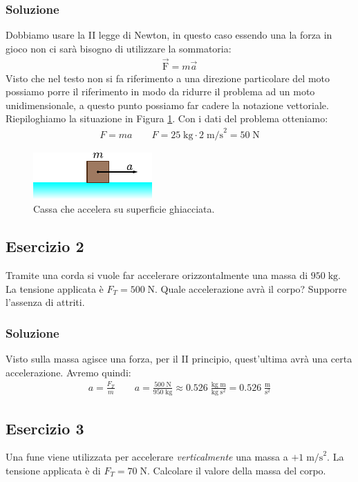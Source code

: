 \documentclass[12pt,a4paper]{book}
\begin{document}
\subsubsection*{Soluzione}
Dobbiamo usare la II legge di Newton, in questo caso essendo una la forza in gioco non ci sarà bisogno di utilizzare la sommatoria:
%
\begin{gather*}
\vec{\text{F}}=m\vec{a}
\end{gather*}
%
Visto che nel testo non si fa riferimento a una direzione particolare del moto possiamo porre il riferimento in modo da ridurre il problema ad un moto unidimensionale, a questo punto possiamo far cadere la notazione vettoriale. Riepiloghiamo la situazione in Figura \ref{fig:4-e-1}. Con i dati del problema otteniamo:
%
\begin{gather*}
F=ma \qquad F=25\;\text{kg} \cdot 2\;\text{m/s}^2 = 50\; \text{N}
\end{gather*}
%

\begin{figure}[!ht]
\centering
\includegraphics[scale=2]{e-1.pdf}
\caption{Cassa che accelera su superficie ghiacciata.} 
\label{fig:4-e-1} 
\end{figure}

\subsection*{Esercizio 2}
Tramite una corda si vuole far accelerare orizzontalmente una massa di $950\;\text{kg}$. La tensione applicata è $F_T=500\;\text{N}$. Quale accelerazione avrà il corpo? Supporre l'assenza di attriti.

\subsubsection*{Soluzione}
Visto sulla massa agisce una forza, per il II principio, quest'ultima avrà una certa accelerazione. Avremo quindi:
%
\begin{gather*}
a=\frac{F_T}{m} \qquad a=\frac{500\;\text{N}}{950\;\text{kg}}\approx 0.526 \;\frac{\text{kg}\;\text{m}}{\text{kg}\;\text{s}^2}= 0.526 \;\frac{\text{m}}{\text{s}^2}
\end{gather*}
%

\subsection*{Esercizio 3}
Una fune viene utilizzata per accelerare \textit{verticalmente} una massa a $+1\;\text{m/s}^2$. La tensione applicata è di $F_T=70\;\text{N}$. Calcolare il valore della massa del corpo. 
\end{document}
